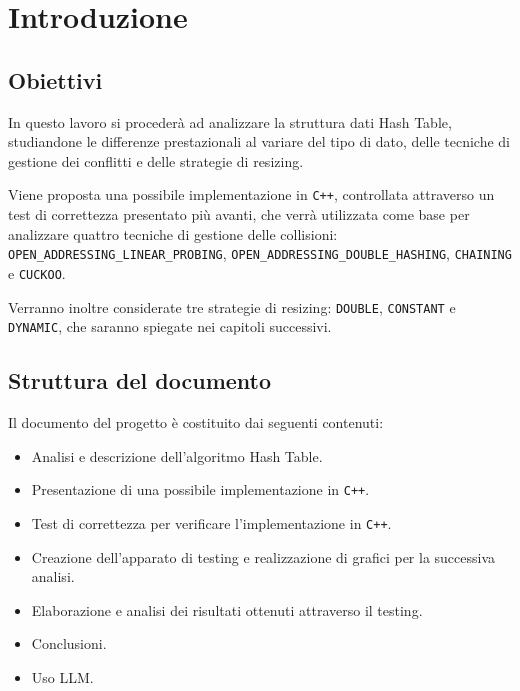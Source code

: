 \chapter{Introduzione}

\section{Obiettivi}
In questo lavoro si procederà ad analizzare la struttura dati Hash Table, 
studiandone le differenze prestazionali al variare del tipo di dato, delle 
tecniche di gestione dei conflitti e delle strategie di resizing.

Viene proposta una possibile implementazione in \texttt{C++}, controllata 
attraverso un test di correttezza presentato più avanti, che verrà utilizzata 
come base per analizzare quattro tecniche di gestione delle collisioni: 
\texttt{OPEN\_ADDRESSING\_LINEAR\_PROBING}, 
\texttt{OPEN\_ADDRESSING\_DOUBLE\_HASHING},\break
\texttt{CHAINING} e \texttt{CUCKOO}.

Verranno inoltre considerate tre strategie di resizing: 
\texttt{DOUBLE}, \texttt{CONSTANT} e \texttt{DYNAMIC}, 
che saranno spiegate nei capitoli successivi.

\section{Struttura del documento}
Il documento del progetto è costituito dai seguenti contenuti:
\begin{itemize}
    \item Analisi e descrizione dell'algoritmo Hash Table.
    \item Presentazione di una possibile implementazione in \texttt{C++}.
    \item Test di correttezza per verificare l'implementazione in \texttt{C++}.
    \item Creazione dell'apparato di testing e realizzazione di grafici per la successiva analisi.
    \item Elaborazione e analisi dei risultati ottenuti attraverso il testing.
    \item Conclusioni.
    \item Uso LLM.
\end{itemize}